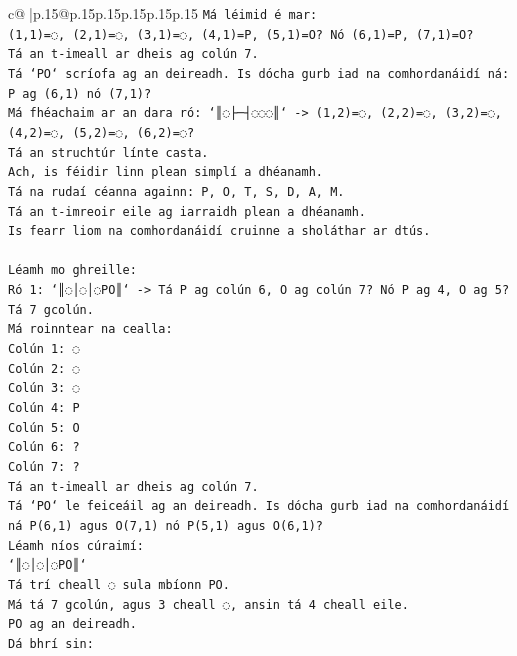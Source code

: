 \documentclass{article}
\begin{document}
{\begin{supertabular}{c@{$\;$}|p{.15\linewidth}@{}p{.15\linewidth}p{.15\linewidth}p{.15\linewidth}p{.15\linewidth}p{.15\linewidth}}
{{{\texttt{Má léimid é mar:} \\
\texttt{(1,1)=◌, (2,1)=◌, (3,1)=◌, (4,1)=P, (5,1)=O? Nó (6,1)=P, (7,1)=O?} \\
\texttt{Tá an t{-}imeall ar dheis ag colún 7.} \\
\texttt{Tá `PO` scríofa ag an deireadh. Is dócha gurb iad na comhordanáidí ná:} \\
\texttt{P ag (6,1) nó (7,1)?} \\
\texttt{Má fhéachaim ar an dara ró: `║◌├─┤◌◌◌║` {-}> (1,2)=◌, (2,2)=◌, (3,2)=◌, (4,2)=◌, (5,2)=◌, (6,2)=◌?} \\
\texttt{Tá an struchtúr línte casta.} \\
\texttt{Ach, is féidir linn plean simplí a dhéanamh.} \\
\texttt{Tá na rudaí céanna againn: P, O, T, S, D, A, M.} \\
\texttt{Tá an t{-}imreoir eile ag iarraidh plean a dhéanamh.} \\
\texttt{Is fearr liom na comhordanáidí cruinne a sholáthar ar dtús.} \\
\\ 
\texttt{Léamh mo ghreille:} \\
\texttt{Ró 1: `║◌│◌│◌PO║` {-}> Tá P ag colún 6, O ag colún 7? Nó P ag 4, O ag 5?} \\
\texttt{Tá 7 gcolún.} \\
\texttt{Má roinntear na cealla:} \\
\texttt{Colún 1: ◌} \\
\texttt{Colún 2: ◌} \\
\texttt{Colún 3: ◌} \\
\texttt{Colún 4: P} \\
\texttt{Colún 5: O} \\
\texttt{Colún 6: ?} \\
\texttt{Colún 7: ?} \\
\texttt{Tá an t{-}imeall ar dheis ag colún 7.} \\
\texttt{Tá `PO` le feiceáil ag an deireadh. Is dócha gurb iad na comhordanáidí ná P(6,1) agus O(7,1) nó P(5,1) agus O(6,1)?} \\
\texttt{Léamh níos cúraimí:} \\
\texttt{`║◌│◌│◌PO║`} \\
\texttt{Tá trí cheall ◌ sula mbíonn PO.} \\
\texttt{Má tá 7 gcolún, agus 3 cheall ◌, ansin tá 4 cheall eile.} \\
\texttt{PO ag an deireadh.} \\
\texttt{Dá bhrí sin:} \\
}}}
\end{supertabular}}
\end{document}
